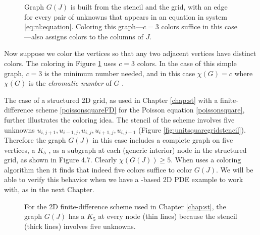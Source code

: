 \begin{figure}

\caption{Graph $G(J)$ is built from the stencil and the grid, with an edge for every pair of unknowns that appears in an equation in system \eqref{eq:nl:equation}.  Coloring this graph---$c=3$ colors suffice in this case---also assigns colors to the columns of $J$.}
\label{fig:fdcolorreaction}
\end{figure}

Now suppose we color the vertices so that any two adjacent vertices have distinct colors.  The coloring in Figure \ref{fig:fdcolorreaction} uses $c=3$ colors.  In the case of this simple graph, $c=3$ is the minimum number needed, and in this case $\chi(G)=c$ where $\chi(G)$ is the \emph{chromatic number} of $G$ \citep{ChartrandLesniakZhang2011}.

The case of a structured 2D grid, as used in Chapter \ref{chap:st} with a finite-difference scheme \eqref{poissonsquareFD} for the Poisson equation \eqref{poissonsquare}, further illustrates the coloring idea.  The stencil of the scheme involves five unknowns $u_{i,j+1}, u_{i-1,j}, u_{i,j}, u_{i+1,j}, u_{i,j-1}$ (Figure \ref{fig:unitsquaregridstencil}).  Therefore the graph $G(J)$ in this case includes a complete graph on five vertices, a $K_5$ \citep{ChartrandLesniakZhang2011}, as a subgraph at each (generic interior) node in the structured grid, as shown in Figure 4.7.  Clearly $\chi(G(J))\ge 5$.  When \PETSc uses a coloring algorithm then it finds that indeed five colors suffice to color $G(J)$.  We will be able to verify this behavior when we have a \pSNES-based 2D PDE example to work with, as in the next Chapter.

\begin{figure}

\caption{For the 2D finite-difference scheme used in Chapter \ref{chap:st}, the graph $G(J)$ has a $K_5$ at every node (thin lines) because the stencil (thick lines) involves five unknowns.}
\label{fig:colorstencilplane}
\end{figure}

